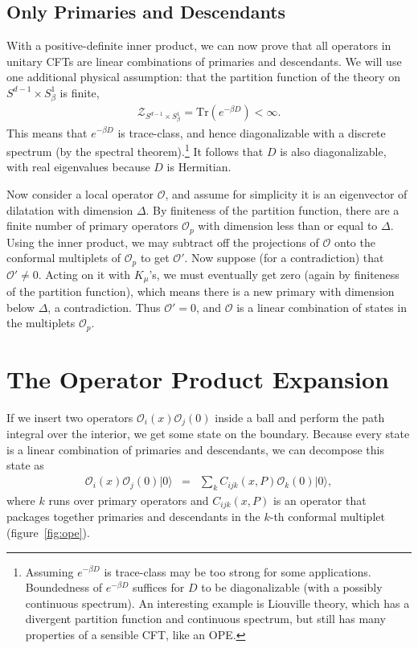 \documentclass{ws-rv9x6}
\newcommand\be{\begin{eqnarray}}
\newcommand\ee{\end{eqnarray}}
\newcommand\cO{\mathcal{O}}
\newcommand\<\langle
\renewcommand\>\rangle
\renewcommand\.{\cdot}
\newcommand\x\times
\newcommand\De{\Delta}
\newcommand\oo\infty
\renewcommand\b\beta
\newcommand\Tr{\mathrm{Tr}}
\begin{document}
\subsection{Only Primaries and Descendants}
\label{sec:onlyprimariesanddescendants}

With a positive-definite inner product, we can now prove that all operators in unitary CFTs are linear combinations of primaries and descendants. We will use one additional physical assumption: that the partition function of the theory on $S^{d-1}\x S^1_\beta$ is finite,
\be
\mathcal{Z}_{S^{d-1}\x S^1_\beta} = \Tr(e^{-\beta D}) < \oo.
\ee
This means that $e^{-\beta D}$ is trace-class, and hence diagonalizable with a discrete spectrum (by the spectral theorem).\footnote{Assuming $e^{-\b D}$ is trace-class may be too strong for some applications. Boundedness of $e^{-\b D}$ suffices for $D$ to be diagonalizable (with a possibly continuous spectrum). An interesting example is Liouville theory, which has a divergent partition function and continuous spectrum, but still has many properties of a sensible CFT, like an OPE.} It follows that $D$ is also diagonalizable, with real eigenvalues because $D$ is Hermitian.

Now consider a local operator $\cO$, and assume for simplicity it is an eigenvector of dilatation with dimension $\De$.  By finiteness of the partition function, there are a finite number of primary operators $\cO_p$ with dimension less than or equal to $\De$.  Using the inner product, we may subtract off the projections of $\cO$ onto the conformal multiplets of $\cO_p$ to get $\cO'$.  Now suppose (for a contradiction) that $\cO'\neq 0$.  Acting on it with $K_\mu$'s, we must eventually get zero (again by finiteness of the partition function), which means there is a new primary with dimension below $\De$, a contradiction.  Thus $\cO'=0$, and $\cO$ is a linear combination of states in the multiplets $\cO_p$.

\section{The Operator Product Expansion}

If we insert two operators $\cO_i(x)\cO_j(0)$ inside a ball and perform the path integral over the interior, we get some state on the boundary.  Because every state is a linear combination of primaries and descendants, we can decompose this state as
\be
\label{eq:opeinitial}
\cO_i(x)\cO_j(0)|0\> &=& \sum_{k}C_{ijk}(x,P)\cO_k(0) |0\>,
\ee
where $k$ runs over primary operators and $C_{ijk}(x,P)$ is an operator that packages together primaries and descendants in the $k$-th conformal multiplet (figure~\ref{fig:ope}).
\end{document}
